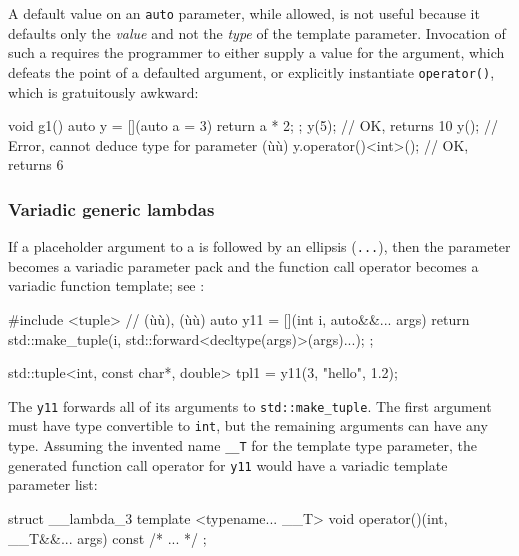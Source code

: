 {A default value on an \lstinline!auto! parameter, while allowed, is not
useful because it defaults only the \emph{value} and not the \emph{type}
of the template parameter. Invocation of such a 
requires the programmer to either supply a value for the argument, which
defeats the point of a defaulted argument, or explicitly instantiate
\lstinline!operator()!, which is gratuitously awkward:

\begin{emcppslisting}[emcppsstandards={c++14}]
void g1()
{
    auto y = [](auto a = 3) { return a * 2; };
    y(5);                // OK, returns 10
    y();                 // Error, cannot deduce type for parameter (ù{}ù)
    y.operator()<int>(); // OK, returns 6
}
\end{emcppslisting}
    

\subsubsection[Variadic generic lambdas]{Variadic generic lambdas}\label{variadic-generic-lambdas}

If a placeholder argument to a  is followed by an
ellipsis (\lstinline!...!), then the parameter becomes a variadic parameter
pack and the function call operator becomes a variadic function
template; see :

\begin{emcppslisting}[emcppsstandards={c++14}]
#include <tuple>  // (ù{}ù), (ù{}ù)
auto y11 = [](int i, auto&&... args)
{
    return std::make_tuple(i, std::forward<decltype(args)>(args)...);
};

std::tuple<int, const char*, double> tpl1 = y11(3, "hello", 1.2);
\end{emcppslisting}
    

\noindent The \lstinline!y11!  forwards all of its arguments
to \lstinline!std::make_tuple!. The first argument must have type
convertible to \lstinline!int!, but the remaining arguments can have any
type. Assuming the invented name \lstinline!__T! for the template type
parameter, the generated function call operator for \lstinline!y11! would
have a variadic template parameter list:

\begin{emcppslisting}
struct __lambda_3
{
    template <typename... __T> void operator()(int, __T&&... args) const
    {
        /* ... */
    }
};
\end{emcppslisting}
    

}
